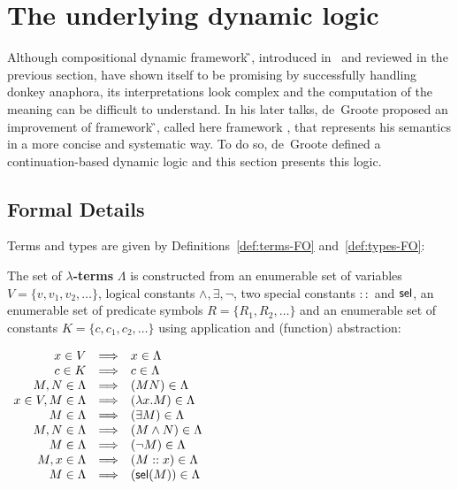 \section{The underlying dynamic logic}

Although compositional dynamic framework {\G}, introduced in~\cite{deGroote:2006:Towards-a-Montagovian-Account-of-Dynamics} and reviewed in the previous section, have shown itself to be promising by successfully handling donkey anaphora, its interpretations look complex and the computation of the meaning can be difficult to understand. In his later talks, de~Groote proposed an improvement of framework {\G}, called here framework {\GN}, that represents his semantics in a more concise and systematic way. To do so, de~Groote defined a continuation-based dynamic logic and this section presents this logic.

\subsection{Formal Details}

Terms and types are given by Definitions~\ref{def:terms-FO} and~\ref{def:types-FO}:
\begin{definition}\label{def:FO-lambda-terms}
 The set of \textbf{$\lambda$-terms} $\Lambda$ is constructed from an enumerable set of variables $V = \{ v, v_1, v_2, \dots \}$, logical constants $\land, \exists, \neg$, two special constants $::$ and $\mathsf{sel}$, an enumerable set of predicate symbols $R = \{ R_1, R_2, \dots  \}$ and an enumerable set of constants $K = \{ c, c_1, c_2, \dots \}$  using application and (function) abstraction:
\begin{center}
$
\begin{array}{rcl}
x \in V & \Longrightarrow & x \in \Lambda\\
c \in K & \Longrightarrow & c \in \Lambda\\
M,N \in \Lambda &  \Longrightarrow & (MN) \in \Lambda\\ 
 x \in V, M \in \Lambda&  \Longrightarrow  & (\lambda x.M) \in \Lambda \\
  M \in \Lambda&  \Longrightarrow  & (\exists M) \in \Lambda\\ 
M,N \in \Lambda &  \Longrightarrow  & (M \land N) \in \Lambda \\
M \in \Lambda &  \Longrightarrow  & (\neg M)  \in \Lambda \\
M,x \in \Lambda &  \Longrightarrow  & (M::x) \in \Lambda\\
M \in \Lambda &  \Longrightarrow  & (\mathsf{sel}(M))  \in \Lambda
\end{array} 
$
\end{center}
\label{def:terms-FO}
\end{definition}


